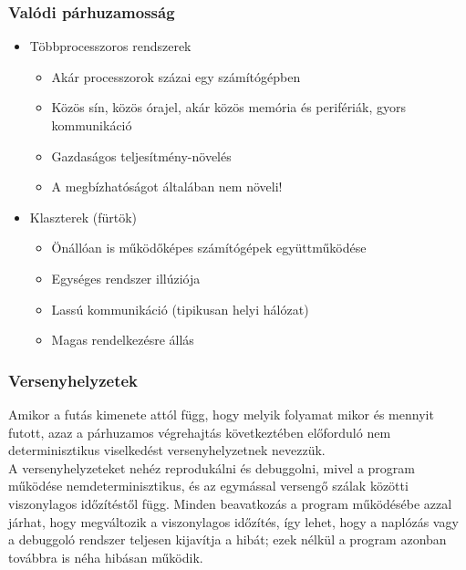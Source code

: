 \documentclass[tikz,12pt,margin=0px]{article}
\begin{document}
    \subsubsection*{Valódi párhuzamosság}

    \begin{itemize}[topsep=8pt,itemsep=4pt,partopsep=4pt, parsep=4pt]
        \item Többprocesszoros rendszerek
        \begin{itemize}
            \item Akár processzorok százai egy számítógépben
            \item Közös sín, közös órajel, akár közös memória és perifériák, gyors kommunikáció
            \item Gazdaságos teljesítmény-növelés
            \item A megbízhatóságot általában nem növeli!
        \end{itemize}
        \item Klaszterek (fürtök)
        \begin{itemize}
            \item Önállóan is működőképes számítógépek együttműködése
            \item Egységes rendszer illúziója
            \item Lassú kommunikáció (tipikusan helyi hálózat)
            \item Magas rendelkezésre állás
        \end{itemize}
    \end{itemize}

    \subsubsection*{Versenyhelyzetek}

    Amikor a futás kimenete attól függ, hogy melyik folyamat mikor és mennyit futott, azaz a párhuzamos végrehajtás következtében előforduló nem determinisztikus viselkedést versenyhelyzetnek nevezzük.\\

    \noindent A versenyhelyzeteket nehéz reprodukálni és debuggolni, mivel a program működése nemdeterminisztikus, és az egymással versengő szálak közötti viszonylagos időzítéstől függ. Minden beavatkozás a program működésébe azzal járhat, hogy megváltozik a viszonylagos időzítés, így lehet, hogy a naplózás vagy a debuggoló rendszer teljesen kijavítja a hibát; ezek nélkül a program azonban továbbra is néha hibásan működik.\\
\end{document}
